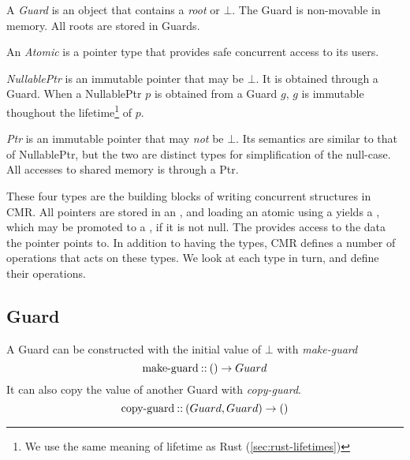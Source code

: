 \begin{definition}
  A \emph{Guard} is an object that contains a \emph{root} or $\bot$. The Guard is non-movable in
  memory. All roots are stored in Guards.
\end{definition}

\begin{definition}[Atomic]
  An \emph{Atomic} is a pointer type that provides safe concurrent access to its users.
\end{definition}

\begin{definition}[NullablePtr]
  \emph{NullablePtr} is an immutable pointer that may be $\bot$. It is obtained through a Guard.
  When a NullablePtr $p$ is obtained from a Guard $g$, $g$ is immutable thoughout the
  lifetime\footnote{We use the same meaning of lifetime as Rust (\cref{sec:rust-lifetimes})}
  of $p$.
\end{definition}

\begin{definition}[Ptr]
  \emph{Ptr} is an immutable pointer that may \emph{not} be $\bot$. Its semantics are similar to
  that of NullablePtr, but the two are distinct types for simplification of the null-case. All
  accesses to shared memory is through a Ptr.
\end{definition}

These four types are the building blocks of writing concurrent structures in CMR\@. All pointers
are stored in an , and loading an atomic using a  yields a ,
which may be promoted to a , if it is not null. The  provides access to the data
the pointer points to.  In addition to having the types, CMR defines a number of operations that
acts on these types.  We look at each type in turn, and define their operations.

\subsection{Guard}
A Guard can be constructed with the initial value of $\bot$ with \emph{make-guard}
\begin{equation}\label{eq:make-guard}
  \text{make-guard\:::\:} () \to Guard
\end{equation}
It can also copy the value of another Guard with \emph{copy-guard}.
\begin{equation}\label{eq:copy-guard}
  \text{copy-guard\:::\:} (Guard, Guard) \to ()
\end{equation}

